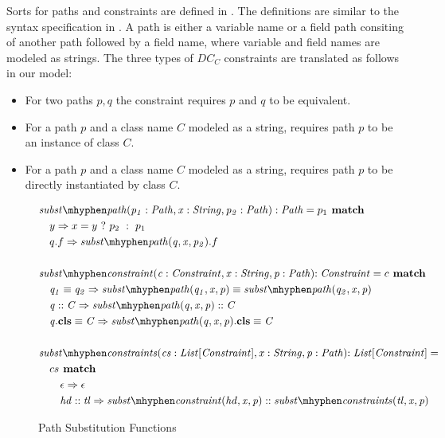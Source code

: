 Sorts for paths and constraints are defined in .
The definitions are similar to the syntax specification in .
A path is either a variable name or a field path consiting
of another path followed by a field name, where variable and field names
are modeled as strings.
The three types of $DC_C$ constraints are translated as follows in our model:
\begin{itemize}
  \item For two paths $p, q$ the constraint  requires $p$ and $q$
        to be equivalent.
  \item For a path $p$ and a class name $C$ modeled as a string,
         requires path $p$ to be an instance of class $C$.
  \item For a path $p$ and a class name $C$ modeled as a string,
         requires path $p$ to be directly instantiated by class $C$.
\end{itemize}\quad
\begin{figure}[t]
\centering
\begin{align*}
&\substpath{p_1: Path}{x: String}{p_2: Path}:\mIt{Path} = p_1 \match\\
&\quad y \Rightarrow \ite{x=y}{p_2}{p_1}\\
&\quad q.f \Rightarrow \substpath{q}{x}{p_2}.f\\
\\
&\substconstr{c: Constraint}{x: String}{p: Path}\mathit{: Constraint} = c \match \\
&\quad \case{\pathEq{q_1}{q_2}}
  {\pathEq
    {\substpath{q_1}{x}{p}}
    {\substpath{q_2}{x}{p}}}\\
&\quad \case{\instOf{q}{C}}
  {\instOf{\substpath{q}{x}{p}}{C}}\\
&\quad \case{\instBy{q}{C}}
  {\instBy{\substpath{q}{x}{p}}{C}}\\\\
&\substconstrs{cs: List[Constraint]}{x: String}{p: Path}\mathit{: List[Constraint]} =\\
&\quad cs \match\\
&\qquad \case{\epsilon}{\epsilon}\\
&\qquad \case{hd :: tl}
  {\substconstr{hd}{x}{p} ::
  \substconstrs{tl}{x}{p}}
\end{align*}
\caption{Path Substitution Functions}
\label{subfig:axioms-naive-general-funs}
\end{figure}\\
